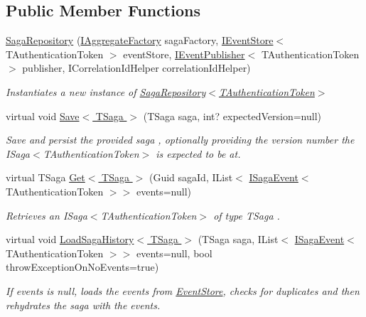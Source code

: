 \subsection*{Public Member Functions}
\begin{DoxyCompactItemize}
\item 
\hyperlink{classCqrs_1_1Domain_1_1SagaRepository_a2981231b25fa89133ab50796cd352fbf_a2981231b25fa89133ab50796cd352fbf}{Saga\+Repository} (\hyperlink{interfaceCqrs_1_1Domain_1_1Factories_1_1IAggregateFactory}{I\+Aggregate\+Factory} saga\+Factory, \hyperlink{interfaceCqrs_1_1Events_1_1IEventStore}{I\+Event\+Store}$<$ T\+Authentication\+Token $>$ event\+Store, \hyperlink{interfaceCqrs_1_1Events_1_1IEventPublisher}{I\+Event\+Publisher}$<$ T\+Authentication\+Token $>$ publisher, I\+Correlation\+Id\+Helper correlation\+Id\+Helper)
\begin{DoxyCompactList}\small\item\em Instantiates a new instance of \hyperlink{classCqrs_1_1Domain_1_1SagaRepository_a2981231b25fa89133ab50796cd352fbf_a2981231b25fa89133ab50796cd352fbf}{Saga\+Repository$<$\+T\+Authentication\+Token$>$} \end{DoxyCompactList}\item 
virtual void \hyperlink{classCqrs_1_1Domain_1_1SagaRepository_a84cae424cb01de22864ae7d960007cd0_a84cae424cb01de22864ae7d960007cd0}{Save$<$ T\+Saga $>$} (T\+Saga saga, int? expected\+Version=null)
\begin{DoxyCompactList}\small\item\em Save and persist the provided {\itshape saga} , optionally providing the version number the I\+Saga$<$\+T\+Authentication\+Token$>$ is expected to be at. \end{DoxyCompactList}\item 
virtual T\+Saga \hyperlink{classCqrs_1_1Domain_1_1SagaRepository_a1b80ecc2a5719d1681ca5d182a252120_a1b80ecc2a5719d1681ca5d182a252120}{Get$<$ T\+Saga $>$} (Guid saga\+Id, I\+List$<$ \hyperlink{interfaceCqrs_1_1Events_1_1ISagaEvent}{I\+Saga\+Event}$<$ T\+Authentication\+Token $>$$>$ events=null)
\begin{DoxyCompactList}\small\item\em Retrieves an I\+Saga$<$\+T\+Authentication\+Token$>$ of type {\itshape T\+Saga} . \end{DoxyCompactList}\item 
virtual void \hyperlink{classCqrs_1_1Domain_1_1SagaRepository_af6af9066681e47bc4ff2e14358321fb8_af6af9066681e47bc4ff2e14358321fb8}{Load\+Saga\+History$<$ T\+Saga $>$} (T\+Saga saga, I\+List$<$ \hyperlink{interfaceCqrs_1_1Events_1_1ISagaEvent}{I\+Saga\+Event}$<$ T\+Authentication\+Token $>$$>$ events=null, bool throw\+Exception\+On\+No\+Events=true)
\begin{DoxyCompactList}\small\item\em If {\itshape events}  is null, loads the events from \hyperlink{namespaceCqrs_1_1EventStore}{Event\+Store}, checks for duplicates and then rehydrates the {\itshape saga}  with the events. \end{DoxyCompactList}\end{DoxyCompactItemize}

